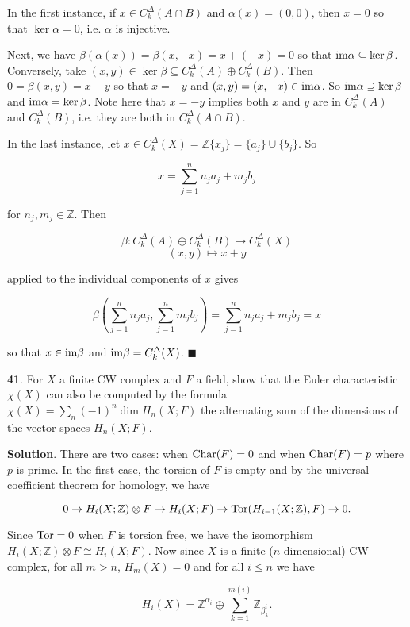 \documentclass{article}
\newcommand{\Z}{\mathbb{Z}}
\newcommand{\Tor}{\textnormal{Tor}}
\newcommand{\Char}{\textnormal{Char}}
\newcommand{\im}{\textnormal{im}}
\begin{document}
In the first instance, if $x\in C_{k}^{\Delta}(A\cap B)$ and $\alpha(x) = (0, 0)$, then $x = 0$ so that $\ker \alpha = 0$, i.e. $\alpha$ is injective.
\medskip

Next, we have $\beta(\alpha(x)) = \beta(x, -x) = x + (-x) = 0$ so that $\im \alpha\subseteq \ker \beta$. Conversely, take $(x, y)\in \ker \beta\subseteq C_{k}^{\Delta}(A)\oplus C_{k}^{\Delta}(B)$. Then $0 = \beta(x, y) = x + y$ so that $x = -y$ and $(x, y) = (x, -x)\in \im \alpha$. So $\im \alpha\supseteq \ker \beta$ and $\im \alpha = \ker \beta$. Note here that $x = -y$ implies both $x$ and $y$ are in $C_{k}^{\Delta}(A)$ and $C_{k}^{\Delta}(B)$, i.e. they are both in $C_{k}^{\Delta}(A\cap B)$.
\medskip

In the last instance, let $x\in C_{k}^{\Delta}(X) = \Z\{x_{j}\} = \{a_{j}\}\cup \{b_{j}\}$. So

$$x = \sum_{j=1}^{n}n_{j}a_{j} + m_{j}b_{j}$$

for $n_{j},m_{j}\in \Z$. Then

$$\beta: C_{k}^{\Delta}(A)\oplus C_{k}^{\Delta}(B)\to C_{k}^{\Delta}(X)$$
$$(x, y)\mapsto x + y$$

applied to the individual components of $x$ gives

$$\beta\left(\sum_{j=1}^{n}n_{j}a_{j}, \sum_{j=1}^{n}m_{j}b_{j}\right) = \sum_{j=1}^{n}n_{j}a_{j} + m_{j}b_{j} = x$$

so that $x\in \im \beta$ and $\im \beta = C_{k}^{\Delta}(X)$. $\blacksquare$
\bigskip
\bigskip

\textbf{41}. For $X$ a finite CW complex and $F$ a field, show that the Euler characteristic $\chi(X)$ can also be computed by the formula $\chi(X) = \sum_{n}(-1)^{n} \dim H_{n}(X;F)$ the alternating sum of the dimensions of the vector spaces $H_{n}(X;F)$.
\medskip

\textbf{Solution}. There are two cases: when $\Char(F) = 0$ and when $\Char(F) = p$ where $p$ is prime. In the first case, the torsion of $F$ is empty and by the universal coefficient theorem for homology, we have

$$0\to H_{i}(X; \Z)\otimes F\to H_{i}(X; F)\to \Tor(H_{i-1}(X; \Z), F)\to 0.$$

Since $\Tor = 0$ when $F$ is torsion free, we have the isomorphism $H_{i}(X; \Z)\otimes F\cong H_{i}(X; F)$. Now since $X$ is a finite ($n$-dimensional) CW complex, for all $m > n$, $H_{m}(X) = 0$ and for all $i\leq n$ we have

$$H_{i}(X) = \Z^{\alpha_{i}}\oplus \sum_{k=1}^{m(i)} \Z_{\beta_{k}^{i}}.$$
\end{document}
